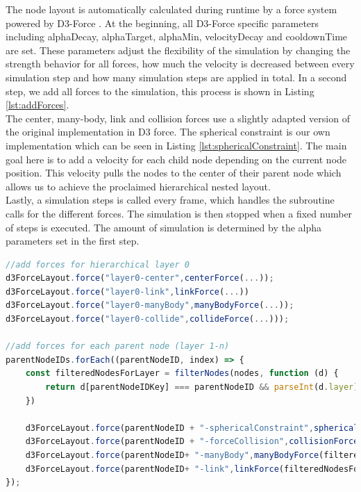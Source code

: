 The node layout is automatically calculated during runtime by a force system powered by D3-Force \cite{bostock_d3forcejs_nodate}. At the beginning, all D3-Force specific parameters including alphaDecay, alphaTarget, alphaMin, velocityDecay and cooldownTime are set. 
These parameters adjust the flexibility of the simulation by changing the strength behavior for all forces, how much the velocity is decreased between every simulation step and how many simulation steps are applied in total.
In a second step, we add all forces to the simulation, this process is shown in Listing \ref{lst:addForces}.\\
The center, many-body, link and collision forces use a slightly adapted version of the original implementation in D3 force. 
The spherical constraint is our own implementation which can be seen in Listing \ref{lst:sphericalConstraint}. The main goal here is to add a velocity for each child node depending on the current node position. This velocity pulls the nodes to the center of their parent node which allows us to achieve the proclaimed hierarchical nested layout.\\
Lastly, a simulation steps is called every frame, which handles the subroutine calls for the different forces. The simulation is then stopped when a fixed number of steps is executed. The amount of simulation is determined by the alpha parameters set in the first step.

\begin{lstlisting}[language=JavaScript,label={lst:addForces},caption=Simplified algorithm that shows which forces are added to the simulation.] 
//add forces for hierarchical layer 0
d3ForceLayout.force("layer0-center",centerForce(...));
d3ForceLayout.force("layer0-link",linkForce(...))
d3ForceLayout.force("layer0-manyBody",manyBodyForce(...));
d3ForceLayout.force("layer0-collide",collideForce(...)));

//add forces for each parent node (layer 1-n)
parentNodeIDs.forEach((parentNodeID, index) => {
    const filteredNodesForLayer = filterNodes(nodes, function (d) {
        return d[parentNodeIDKey] === parentNodeID && parseInt(d.layer) === childLayer;
    })

    d3ForceLayout.force(parentNodeID + "-sphericalConstraint",sphericalConstraint(filteredNodesForLayer,...));
    d3ForceLayout.force(parentNodeID + "-forceCollision",collisionForce(filteredNodesForLayer,...));
    d3ForceLayout.force(parentNodeID+ "-manyBody",manyBodyForce(filteredNodesForLayer,...));
    d3ForceLayout.force(parentNodeID+ "-link",linkForce(filteredNodesForLayer,...));
});
\end{lstlisting}
\pagebreak


